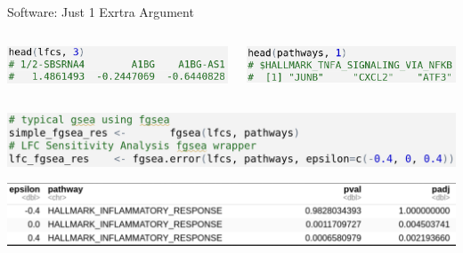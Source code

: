 \documentclass{beamer}
\begin{document}
\begin{frame}[label={sec:org6ffa9d4},fragile]{Software: Just 1 Exrtra Argument}

\begin{columns}
\begin{column}{0.5\columnwidth}
\begin{center}
\includegraphics[width=0.85\linewidth]{./images/lfcs.png}
\end{center}
\end{column}
\begin{column}{0.5\columnwidth}
\begin{center}
\includegraphics[width=0.85\linewidth]{./images/pathways.png}
\end{center}
\end{column}
\end{columns}

\begin{center}
\includegraphics[width=1\linewidth]{./images/fgsea_example.png}
\end{center}

\pause
\begin{center}
\includegraphics[width=1\linewidth]{./images/lfc_sens_output_small.png}
\end{center}


\end{frame}
\end{document}

